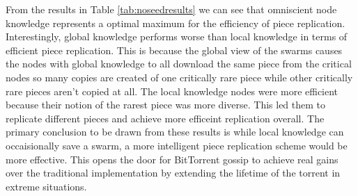 From the results in Table \ref{tab:noseedresults} we can see that omniscient node knowledge
represents a optimal maximum for the efficiency of piece
replication. Interestingly, global knowledge performs worse than local
knowledge in terms of efficient piece replication. This is because the
global view of the swarms causes the nodes with global knowledge to all
download the same piece from the critical nodes so many copies are
created of one critically rare piece while other critically rare
pieces aren't copied at all. The local knowledge nodes were 
more efficient because their notion of the rarest piece was more
diverse. This led them to replicate different pieces and achieve more
efficeint replication overall. The primary conclusion to be drawn from
these results is while local knowledge can
occaisionally save a swarm, a more intelligent piece replication scheme
would be more effective. This opens the door for BitTorrent gossip to
achieve real gains over the traditional implementation by extending
the lifetime of the torrent in extreme situations.
